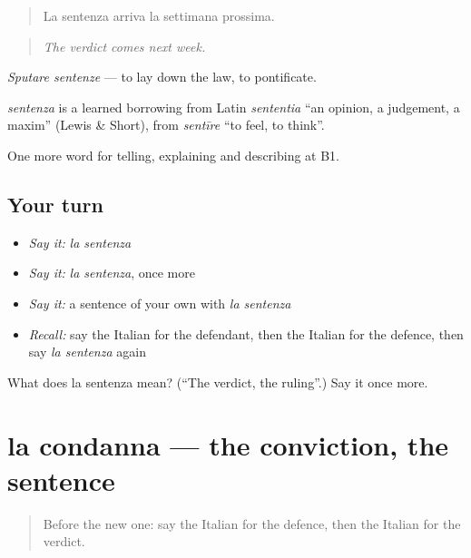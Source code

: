 \begin{quote}
La sentenza arriva la settimana prossima.
\end{quote}

\begin{quote}
\emph{The verdict comes next week.}
\end{quote}

\emph{Sputare sentenze} — to lay down the law, to pontificate.

\begin{cousinweb}
\emph{sentenza} is a learned borrowing from Latin \emph{sententia} \textquotedblleft{}an opinion, a judgement, a maxim\textquotedblright{} (Lewis \& Short), from \emph{sentīre} \textquotedblleft{}to feel, to think\textquotedblright{}.
\end{cousinweb}

\begin{grammarlens}[title={What you've built}]
One more word for telling, explaining and describing at B1.
\end{grammarlens}

\subsection*{Your turn}
\begin{itemize}
\raggedright
  \item \emph{Say it:} \emph{la sentenza}
  \item \emph{Say it:} \emph{la sentenza}, once more
  \item \emph{Say it:} a sentence of your own with \emph{la sentenza}
  \item \emph{Recall:} say the Italian for the defendant, then the Italian for the defence, then say \emph{la sentenza} again
\end{itemize}

\begin{tcolorbox}[breakable,colback=teal!4,colframe=teal!35!black,title={Before you move on}]
What does la sentenza mean? (\textquotedblleft{}The verdict, the ruling\textquotedblright{}.) Say it once more.
\end{tcolorbox}
\section[la condanna]{la condanna — the conviction, the sentence}

\label{lesson:IT-C392-condanna}



\begin{quote}
Before the new one: say the Italian for the defence, then the Italian for the verdict.
\end{quote}

